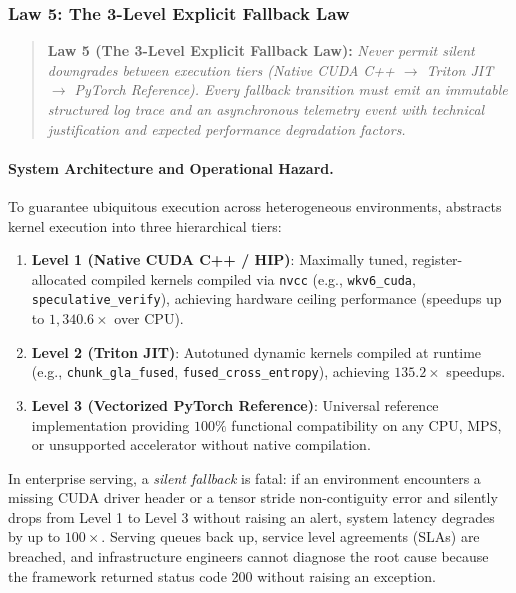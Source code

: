 \subsubsection{Law 5: The 3-Level Explicit Fallback Law}
\label{sec:law5_explicit_fallback}

\begin{quote}
\textbf{Law 5 (The 3-Level Explicit Fallback Law):} \emph{Never permit silent downgrades between execution tiers (Native CUDA C++ $\to$ Triton JIT $\to$ PyTorch Reference). Every fallback transition must emit an immutable structured log trace and an asynchronous telemetry event with technical justification and expected performance degradation factors.}
\end{quote}

\paragraph{System Architecture and Operational Hazard.}
To guarantee ubiquitous execution across heterogeneous environments, \neuralops{} abstracts kernel execution into three hierarchical tiers:
\begin{enumerate}
    \item \textbf{Level 1 (Native CUDA C++ / HIP)}: Maximally tuned, register-allocated compiled kernels compiled via \texttt{nvcc} (e.g., \texttt{wkv6\_cuda}, \texttt{speculative\_verify}), achieving hardware ceiling performance (speedups up to $1{,}340.6\times$ over CPU).
    \item \textbf{Level 2 (Triton JIT)}: Autotuned dynamic kernels compiled at runtime (e.g., \texttt{chunk\_gla\_fused}, \texttt{fused\_cross\_entropy}), achieving $135.2\times$ speedups.
    \item \textbf{Level 3 (Vectorized PyTorch Reference)}: Universal reference implementation providing $100\%$ functional compatibility on any CPU, MPS, or unsupported accelerator without native compilation.
\end{enumerate}

In enterprise serving, a \emph{silent fallback} is fatal: if an environment encounters a missing CUDA driver header or a tensor stride non-contiguity error and silently drops from Level 1 to Level 3 without raising an alert, system latency degrades by up to $100\times$. Serving queues back up, service level agreements (SLAs) are breached, and infrastructure engineers cannot diagnose the root cause because the framework returned status code 200 without raising an exception.


